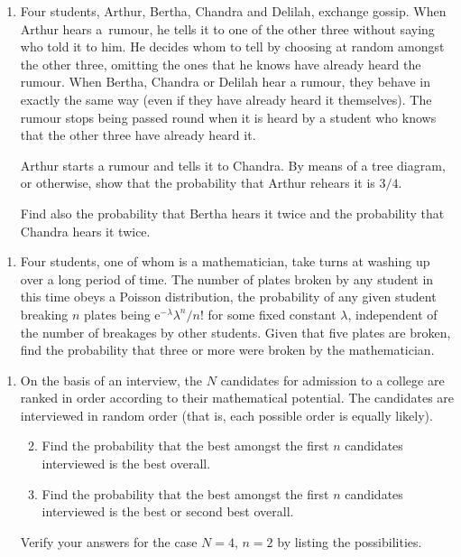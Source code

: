 \documentclass[a4, 11pt]{report}
\newlength{\qspace}
\newcounter{qnumber}
\newenvironment{question}%
 {\vspace{\qspace}
  \begin{enumerate}[\bfseries 1\quad][10]%
    \setcounter{enumi}{\value{qnumber}}%
    \item%
 }
{
  \end{enumerate}
  \filbreak
  \stepcounter{qnumber}
 }
\newenvironment{questionparts}[1][1]%
 {
  \begin{enumerate}[\bfseries (i)]%
    \setcounter{enumii}{#1}
    \addtocounter{enumii}{-1}
    \setlength{\itemsep}{5mm}
    \setlength{\parskip}{8pt}
 }
 {
  \end{enumerate}
 }
\def\e{{\mathrm e}}
\begin{document}
\begin{question}
Four students, Arthur, Bertha, Chandra and Delilah, exchange gossip.
When Arthur hears a~rumour, he tells it to one of the other three without 
saying who told it to him. He decides whom to tell by choosing at
random amongst the other three, omitting the ones that  he knows have already heard the 
rumour. When Bertha, Chandra or Delilah hear a rumour, 
they behave in exactly the same  way (even if they have already heard it themselves). 
The rumour stops being passed round
when it is heard by a student who knows that the other three have already heard
it. 

Arthur starts a rumour and tells it to Chandra. By means of a tree diagram, or otherwise,
show that  the probability that Arthur rehears it is $3/4$. 

Find also the probability that
Bertha hears it twice and the probability that Chandra hears it twice.
\end{question}

\begin{question}
Four students, one of whom is a mathematician, take turns at washing up over a long
period of time. The number of plates broken by any student in this time
obeys a Poisson distribution, the probability of  any given student breaking 
$n$ plates  being  $\e^{-\lambda} \lambda^n/n!$ for some fixed constant $\lambda$, independent
of the number of breakages by other students. 
Given that five plates are broken, find the probability that 
three or more  were broken by the 
mathematician. 
\end{question}

\begin{question}
On the basis of an interview, the $N$ candidates for admission to a college
are ranked in order according to their  mathematical potential. The candidates are interviewed 
in random order (that is, each possible order is equally likely).

\begin{questionparts}
\item Find the probability that the best amongst the first $n$ candidates
interviewed is the best overall.
\item Find the probability that the best amongst the first $n$ candidates
interviewed is  the best or second best overall.
\end{questionparts}
Verify your answers for the case $N=4$, $n=2$ by listing the possibilities.
 
\end{question}
	
\end{document}
